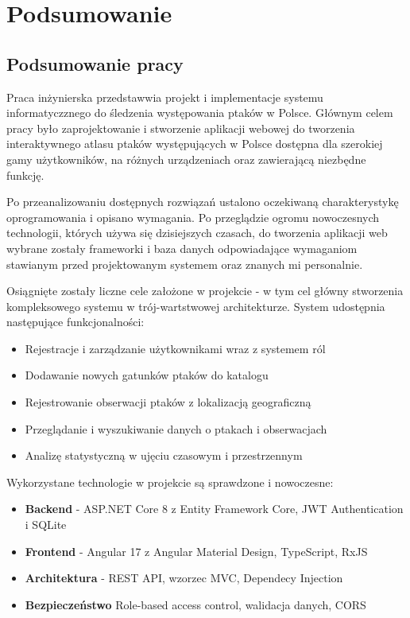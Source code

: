 %


\chapter*{Podsumowanie}

\section*{Podsumowanie pracy}
Praca inżynierska przedstawwia projekt i implementacje systemu informatyczznego do śledzenia występowania ptaków w Polsce. Głównym celem pracy było zaprojektowanie i stworzenie aplikacji webowej do tworzenia interaktywnego atlasu ptaków występujących w Polsce dostępna dla szerokiej gamy użytkowników, na różnych urządzeniach oraz zawierającą niezbędne funkcję. 

Po przeanalizowaniu dostępnych rozwiązań ustalono oczekiwaną charakterystykę oprogramowania i opisano wymagania. Po przeglądzie ogromu nowoczesnych technologii, których używa się dzisiejszych czasach, do tworzenia aplikacji web wybrane zostały frameworki i baza danych odpowiadające wymaganiom stawianym przed projektowanym systemem oraz znanych mi personalnie.

Osiągnięte zostały liczne cele założone w projekcie - w tym cel główny stworzenia kompleksowego systemu w trój-wartstwowej architekturze.
System udostępnia następujące funkcjonalności:
\begin{itemize}
	\item Rejestracje i zarządzanie użytkownikami wraz z systemem ról
	\item Dodawanie nowych gatunków ptaków do katalogu
	\item Rejestrowanie obserwacji ptaków z lokalizacją geograficzną
	\item Przeglądanie i wyszukiwanie danych o ptakach i obserwacjach
	\item Analizę statystyczną w ujęciu czasowym i przestrzennym
\end{itemize}

Wykorzystane technologie w projekcie są sprawdzone i nowoczesne:
\begin{itemize}
	\item \textbf{Backend} - ASP.NET Core 8 z Entity Framework Core, JWT Authentication i SQLite
	\item \textbf{Frontend} - Angular 17 z Angular Material Design, TypeScript, RxJS
	\item \textbf{Architektura} - REST API, wzorzec MVC, Dependecy Injection
	\item \textbf{Bezpieczeństwo}  Role-based access control, walidacja danych, CORS
\end{itemize}

